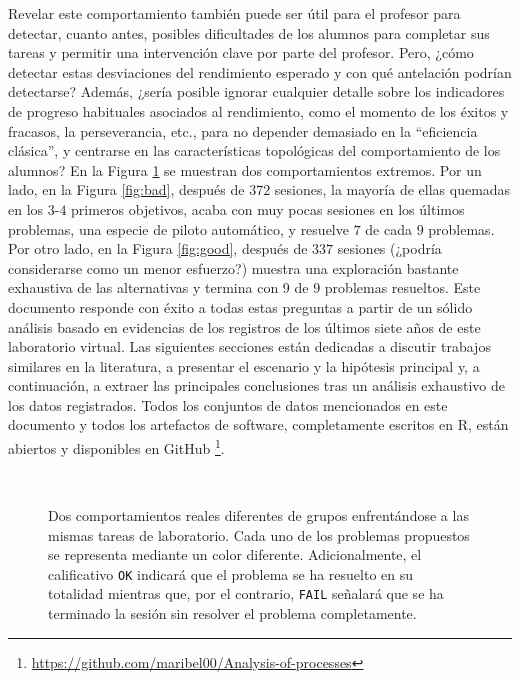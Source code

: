 Revelar este comportamiento también puede ser útil para el profesor para detectar, cuanto antes, posibles dificultades de los alumnos para completar sus tareas y permitir una intervención clave por parte del profesor. Pero, ¿cómo detectar estas desviaciones del rendimiento esperado y con qué antelación podrían detectarse? Además, ¿sería posible ignorar cualquier detalle sobre los indicadores de progreso habituales asociados al rendimiento, como el momento de los éxitos y fracasos, la perseverancia, etc., para no depender demasiado en la ``eficiencia clásica'', y centrarse en las características topológicas del comportamiento de los alumnos? En la Figura \ref{fig:extreme} se muestran dos comportamientos extremos. Por un lado, en la Figura \ref{fig:bad}, después de $372$ sesiones, la mayoría de ellas quemadas en los $3$-$4$ primeros objetivos, acaba con muy pocas sesiones en los últimos problemas, una especie de piloto automático, y resuelve $7$ de cada $9$ problemas. Por otro lado, en la Figura \ref{fig:good}, después de $337$ sesiones (¿podría considerarse como un menor esfuerzo?) muestra una exploración bastante exhaustiva de las alternativas y termina con 9 de 9 problemas resueltos. Este
documento responde con éxito a todas estas preguntas a partir de un sólido análisis basado en evidencias de los registros de los últimos siete años de este laboratorio virtual. Las siguientes secciones están dedicadas a discutir trabajos similares en la literatura, a presentar el escenario y la hipótesis principal y, a continuación, a extraer las principales conclusiones tras un análisis exhaustivo de los datos registrados. Todos los conjuntos de datos mencionados en este documento y todos los artefactos de software, completamente escritos en R, están abiertos y disponibles en GitHub \footnote{\href{https://github.com/maribel00/Analysis-of-processes}{https://github.com/maribel00/Analysis-of-processes}}.

\begin{figure}[H]
\centering
{}\\
\caption{Dos comportamientos reales diferentes de grupos enfrentándose a las mismas tareas de laboratorio. Cada uno de los problemas propuestos se representa mediante un color diferente. Adicionalmente, el calificativo \texttt{OK} indicará que el problema se ha resuelto en su totalidad mientras que, por el contrario, \texttt{FAIL} señalará que se ha terminado la sesión sin resolver el problema completamente.}
\label{fig:extreme}
\end{figure}


